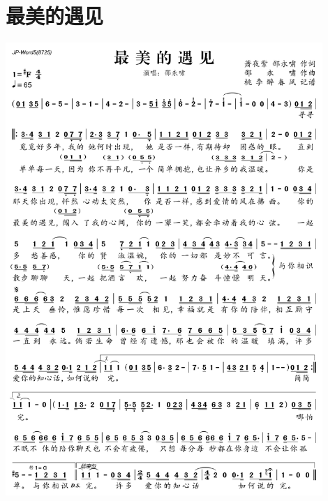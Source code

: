 \documentclass[cn,pad,twocol]{elegantbook}
\begin{document}
\section{最美的遇见} \includegraphics[width=0.9\textwidth]{macos/2020最美的遇见.png}
\end{document}
